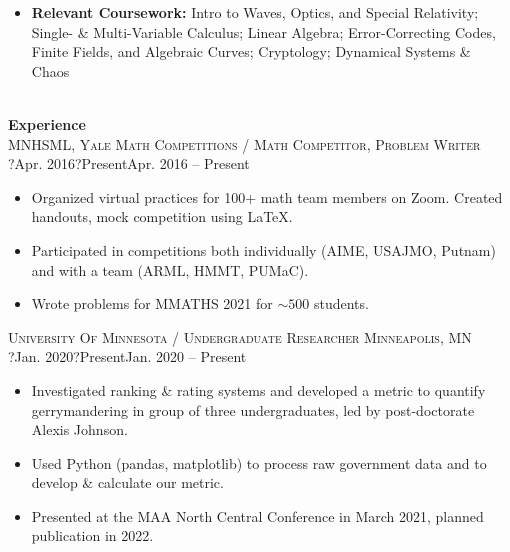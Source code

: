 \documentclass[letterpaper,11pt]{article}
\let\oldl\Large
\renewcommand{\Large}[1]{{\color{yale}\oldl{#1}}}
\let\oldsc\textsc{}
\renewcommand{\textsc}[1]{\normalsize\oldsc{#1}}
\newcommand{\years}[2]{\footnotesize \ifx?#1?#2\else#1 -- #2\fi}
\newenvironment{module}[4]{
\textsc{#1} \hfill \textsc{\footnotesize#4}\\
\years{#2}{#3}
\footnotesize \begin{adjustwidth}{15pt}{0pt}
}{
\end{adjustwidth} 
\normalsize \null\vspace{-11pt}
}
\newenvironment{edmodule}[5]{
\textsc{#1} \hfill \textsc{\footnotesize#4}\\
\years{#2}{#3} \hfill \textsc{\footnotesize#5}
\footnotesize \begin{adjustwidth}{15pt}{0pt}
}{
\end{adjustwidth} 
\normalsize \null\vspace{-11pt}
}
\newcommand{\category}[1]{\textbf{\Large{#1}}\vspace{-5pt}\\ \setstretch{1.35}\null\vspace{-5pt}\newline}
\begin{document}
\begin{itemize}
    \item \textbf{Relevant Coursework:} Intro to Waves, Optics, and Special Relativity; Single- \& Multi-Variable Calculus; Linear Algebra; Error-Correcting Codes, Finite Fields, and Algebraic Curves; Cryptology; Dynamical Systems \& Chaos
\end{itemize}\vspace{-7pt}
\hrulefill\vspace{5pt}\\
\category{Experience}
\begin{module}{MNHSML, Yale Math Competitions / \footnotesize Math Competitor, Problem Writer}{Apr. 2016}{Present}{}
\end{module}\vspace{-25pt}
\begin{itemize}
    \item Organized virtual practices for 100+ math team members on Zoom. Created handouts, mock competition using \LaTeX. 
    \item Participated in competitions both individually (AIME, USAJMO, Putnam) and with a team (ARML, HMMT, PUMaC).
    \item Wrote problems for MMATHS 2021 for $\sim 500$ students.
\end{itemize}
\begin{module}{University Of Minnesota / \footnotesize Undergraduate Researcher}{Jan. 2020}{Present}{Minneapolis, MN} 
\end{module}\vspace{-25pt}
\begin{itemize}
    \item Investigated ranking \& rating systems and developed a metric to quantify gerrymandering in group of three undergraduates, led by post-doctorate Alexis Johnson.
    \item Used Python (pandas, matplotlib) to process raw government data and to develop \& calculate our metric.
    \item Presented at the MAA North Central Conference in March 2021, planned publication in 2022.
\end{itemize}
\end{document}
